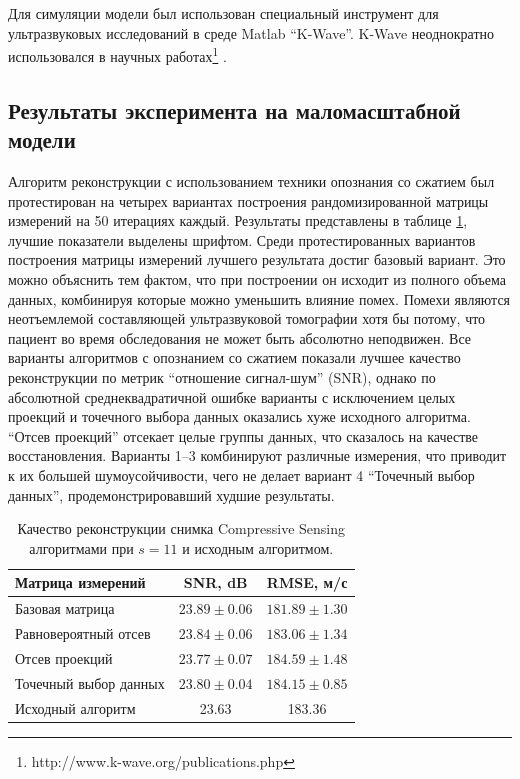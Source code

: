 \documentclass[14pt]{matmex-diploma}
\begin{document}
Для симуляции модели был использован специальный инструмент для ультразвуковых исследований в среде Matlab ``K-Wave''. K-Wave неоднократно использовался в научных работах\footnote{http://www.k-wave.org/publications.php} \cite{treeby2010k}. \\


\subsection{Результаты эксперимента на маломасштабной модели}

Алгоритм реконструкции с использованием техники опознания со сжатием был протестирован на четырех вариантах построения рандомизированной матрицы измерений на 50 итерациях каждый. Результаты представлены в таблице \ref{table:fin_results}, лучшие показатели выделены шрифтом. Среди протестированных вариантов построения матрицы измерений лучшего результата достиг базовый вариант. Это можно объяснить тем фактом, что при построении он исходит из полного объема данных, комбинируя которые можно уменьшить влияние помех. Помехи являются неотъемлемой составляющей ультразвуковой томографии хотя бы потому, что пациент во время обследования не может быть абсолютно неподвижен. Все варианты алгоритмов с опознанием со сжатием показали лучшее качество реконструкции по метрик ``отношение сигнал-шум'' (SNR), однако по абсолютной среднеквадратичной ошибке варианты с исключением целых проекций и точечного выбора данных оказались хуже исходного алгоритма. ``Отсев проекций'' отсекает целые группы данных, что сказалось на качестве восстановления. Варианты 1--3 комбинируют различные измерения, что приводит к их большей шумоусойчивости, чего не делает вариант 4 ``Точечный выбор данных'', продемонстрировавший худшие результаты.

\begin{table}
\centering
\begin{tabular}{| l | c | c | }
    \hline
    Матрица измерений & SNR, dB & RMSE, м/с \\
    \hline
    Базовая матрица & $\mathbf{23.89 \pm 0.06}$ & $\mathbf{181.89 \pm 1.30}$ \\
    Равновероятный отсев & $23.84 \pm 0.06$ & $183.06 \pm 1.34$ \\
    Отсев проекций & $23.77 \pm 0.07$ & $184.59 \pm 1.48$ \\
    Точечный выбор данных & $23.80 \pm 0.04$ & $184.15 \pm 0.85$ \\
    \hline
    Исходный алгоритм & 23.63 & 183.36 \\
    \hline
\end{tabular}
\caption{\small Качество реконструкции снимка Compressive Sensing алгоритмами при $s = 11$  и исходным алгоритмом.}
\label{table:fin_results}
\end{table}
\end{document}
